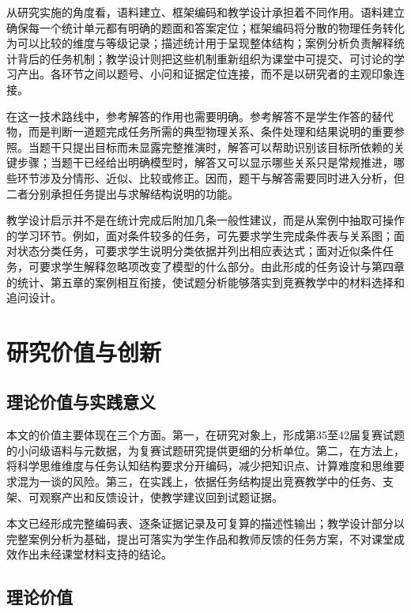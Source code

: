\documentclass[
  12pt,
  a4paper,twoside,openany]{ctexbook}
\begin{document}
从研究实施的角度看，语料建立、框架编码和教学设计承担着不同作用。语料建立确保每一个统计单元都有明确的题面和答案定位；框架编码将分散的物理任务转化为可以比较的维度与等级记录；描述统计用于呈现整体结构；案例分析负责解释统计背后的任务机制；教学设计则把这些机制重新组织为课堂中可提交、可讨论的学习产出。各环节之间以题号、小问和证据定位连接，而不是以研究者的主观印象连接。

在这一技术路线中，参考解答的作用也需要明确。参考解答不是学生作答的替代物，而是判断一道题完成任务所需的典型物理关系、条件处理和结果说明的重要参照。当题干只提出目标而未显露完整推演时，解答可以帮助识别该目标所依赖的关键步骤；当题干已经给出明确模型时，解答又可以显示哪些关系只是常规推进，哪些环节涉及分情形、近似、比较或修正。因而，题干与解答需要同时进入分析，但二者分别承担任务提出与求解结构说明的功能。

教学设计启示并不是在统计完成后附加几条一般性建议，而是从案例中抽取可操作的学习环节。例如，面对条件较多的任务，可先要求学生完成条件表与关系图；面对状态分类任务，可要求学生说明分类依据并列出相应表达式；面对近似条件任务，可要求学生解释忽略项改变了模型的什么部分。由此形成的任务设计与第四章的统计、第五章的案例相互衔接，使试题分析能够落实到竞赛教学中的材料选择和追问设计。

\section{研究价值与创新}\label{ux7814ux7a76ux4ef7ux503cux4e0eux521bux65b0}

\subsection{理论价值与实践意义}\label{ux7406ux8bbaux4ef7ux503cux4e0eux5b9eux8df5ux610fux4e49}

本文的价值主要体现在三个方面。第一，在研究对象上，形成第35至42届复赛试题的小问级语料与元数据，为复赛试题研究提供更细的分析单位。第二，在方法上，将科学思维维度与任务认知结构要求分开编码，减少把知识点、计算难度和思维要求混为一谈的风险。第三，在实践上，依据任务结构提出竞赛教学中的任务、支架、可观察产出和反馈设计，使教学建议回到试题证据。

本文已经形成完整编码表、逐条证据记录及可复算的描述性输出；教学设计部分以完整案例分析为基础，提出可落实为学生作品和教师反馈的任务方案，不对课堂成效作出未经课堂材料支持的结论。

\subsection{理论价值}\label{ux7406ux8bbaux4ef7ux503c}
\end{document}
